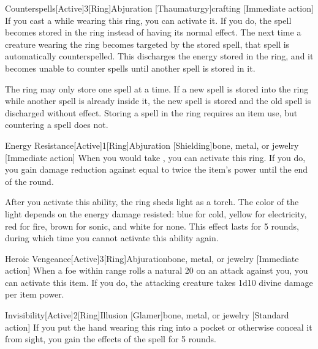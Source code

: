         \begin{magicitemdef}{Counterspells}[Active]{3}[Ring]{Abjuration [Thaumaturgy]}{crafting}
            [Immediate action] If you cast a  while wearing this ring, you can activate it.
            If you do, the spell becomes stored in the ring instead of having its normal effect.
            The next time a creature wearing the ring becomes targeted by the stored spell, that spell is automatically counterspelled.
            This discharges the energy stored in the ring, and it becomes unable to counter spells until another spell is stored in it.

            The ring may only store one spell at a time.
            If a new spell is stored into the ring while another spell is already inside it, the new spell is stored and the old spell is discharged without effect.
            Storing a spell in the ring requires an item use, but countering a spell does not.
        \end{magicitemdef}

        \begin{magicitemdef}{Energy Resistance}[Active]{1}[Ring]{Abjuration [Shielding]}{bone, metal, or jewelry}
            [Immediate action] When you would take , you can activate this ring.
            If you do, you gain damage reduction against  equal to twice the item's power until the end of the round.

            After you activate this ability, the ring sheds light as a torch.
            The color of the light depends on the energy damage resisted: blue for cold, yellow for electricity, red for fire, brown for sonic, and white for none.
            This effect lasts for 5 rounds, during which time you cannot activate this ability again.
        \end{magicitemdef}

        \begin{magicitemdef}{Heroic Vengeance}[Active]{3}[Ring]{Abjuration}{bone, metal, or jewelry}
            [Immediate action] When a foe within \rngmed range rolls a natural 20 on an attack against you, you can activate this item.
            If you do, the attacking creature takes 1d10 divine damage per item power.
        \end{magicitemdef}

        \begin{magicitemdef}{Invisibility}[Active]{2}[Ring]{Illusion [Glamer]}{bone, metal, or jewelry}
            [Standard action] If you put the hand wearing this ring into a pocket or otherwise conceal it from sight, you gain the effects of the  spell for 5 rounds.
        \end{magicitemdef}

